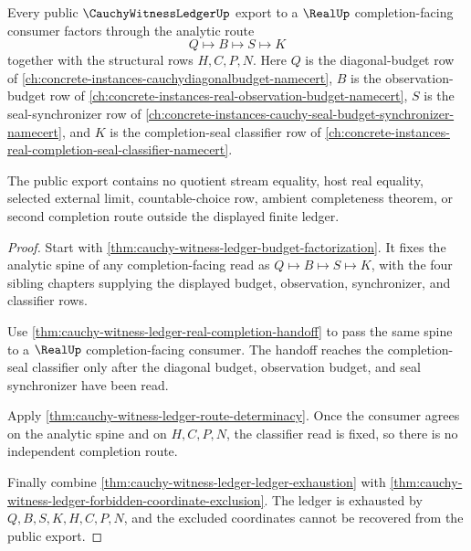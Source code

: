 \begin{theorem}
\label{thm:cauchy-witness-ledger-public-export}
Every public $\CauchyWitnessLedgerUp$ export to a $\RealUp$
completion-facing consumer factors through the analytic route
$$
Q \longmapsto B \longmapsto S \longmapsto K
$$
together with the structural rows $H,C,P,N$. Here $Q$ is the diagonal-budget
row of \autoref{ch:concrete-instances-cauchydiagonalbudget-namecert}, $B$ is
the observation-budget row of
\autoref{ch:concrete-instances-real-observation-budget-namecert}, $S$ is the
seal-synchronizer row of
\autoref{ch:concrete-instances-cauchy-seal-budget-synchronizer-namecert}, and
$K$ is the completion-seal classifier row of
\autoref{ch:concrete-instances-real-completion-seal-classifier-namecert}.

The public export contains no quotient stream equality, host real equality,
selected external limit, countable-choice row, ambient completeness theorem, or
second completion route outside the displayed finite ledger.
\end{theorem}
\begin{proof}
Start with \autoref{thm:cauchy-witness-ledger-budget-factorization}. It fixes
the analytic spine of any completion-facing read as
$Q \longmapsto B \longmapsto S \longmapsto K$, with the four sibling chapters
supplying the displayed budget, observation, synchronizer, and classifier rows.

Use \autoref{thm:cauchy-witness-ledger-real-completion-handoff} to pass the
same spine to a $\RealUp$ completion-facing consumer. The handoff reaches the
completion-seal classifier only after the diagonal budget, observation budget,
and seal synchronizer have been read.

Apply \autoref{thm:cauchy-witness-ledger-route-determinacy}. Once the consumer
agrees on the analytic spine and on $H,C,P,N$, the classifier read is fixed, so
there is no independent completion route.

Finally combine \autoref{thm:cauchy-witness-ledger-ledger-exhaustion} with
\autoref{thm:cauchy-witness-ledger-forbidden-coordinate-exclusion}. The ledger
is exhausted by $Q,B,S,K,H,C,P,N$, and the excluded coordinates cannot be
recovered from the public export.
\end{proof}

